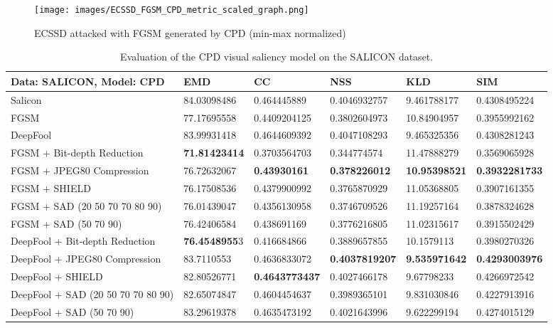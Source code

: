 \documentclass[10pt,twocolumn,letterpaper]{article}
\begin{document}
\begin{figure*}[hbt]
    \centering
    \texttt{[image: images/ECSSD\_FGSM\_CPD\_metric\_scaled\_graph.png]}
    \caption{ECSSD \cite{ECSSD} attacked with FGSM \cite{FGSM} generated by CPD \cite{wu2019cascaded} (min-max normalized)}
    \label{fig:ecssd_fgsm_cpd_metric_graph}
\end{figure*}




\begin{table*}[hbt]
\begin{tabular}{l|l|l|l|l|l}
Data: \textbf{SALICON}, Model: \textbf{CPD}                        & EMD         & CC           & NSS         & KLD         & SIM \\
\hline
Salicon                        & 84.03098486 & 0.464445889  & 0.4046932757 & 9.461788177 & 0.4308495224 \\
FGSM                           & 77.17695558 & 0.4409204125 & 0.3802604973 & 10.84904957 & 0.3955992162 \\
DeepFool                       & 83.99931418 & 0.4644609392 & 0.4047108293 & 9.465325356 & 0.4308281243 \\
\hline
FGSM + Bit-depth Reduction     & \textbf{71.81423414} & 0.3703564703 & 0.344774574  & 11.47888279 & 0.3569065928 \\
FGSM + JPEG80 Compression      & 76.72632067 & \textbf{0.43930161}   & \textbf{0.378226012}  & \textbf{10.95398521} & \textbf{0.3932281733} \\
FGSM + SHIELD                  & 76.17508536 & 0.4379900992 & 0.3765870929 & 11.05368805 & 0.3907161355 \\
FGSM + SAD (20 50 70 70 80 90)            & 76.01439047 & 0.4356130958 & 0.3746709526 & 11.19257164 & 0.3878324628 \\
FGSM + SAD (50 70 90)             & 76.42406584 & 0.438691169  & 0.3776216805 & 11.02315617 & 0.3915502429 \\
\hline
DeepFool + Bit-depth Reduction & \textbf{76.4548955}3 & 0.416684866  & 0.3889657855 & 10.1579113  & 0.3980270326 \\
DeepFool + JPEG80 Compression  & 83.7110553  & 0.4636833072 & \textbf{0.4037819207} & \textbf{9.535971642} & \textbf{0.4293003976} \\
DeepFool + SHIELD              & 82.80526771 & \textbf{0.4643773437} & 0.4027466178 & 9.67798233  & 0.4266972542 \\
DeepFool + SAD (20 50 70 70 80 90)        & 82.65074847 & 0.4604454637 & 0.3989365101 & 9.831030846 & 0.4227913916 \\
DeepFool + SAD (50 70 90)         & 83.29619378 & 0.4635473192 & 0.4021643996 & 9.622299194 & 0.4274015129
\end{tabular}
  \caption{Evaluation of the CPD \cite{wu2019cascaded} visual saliency model\cite{wu2019cascaded} on the SALICON\cite{jiang2015salicon} dataset.}
  \label{table:results_salicon_cpd}
\end{table*}
\end{document}

